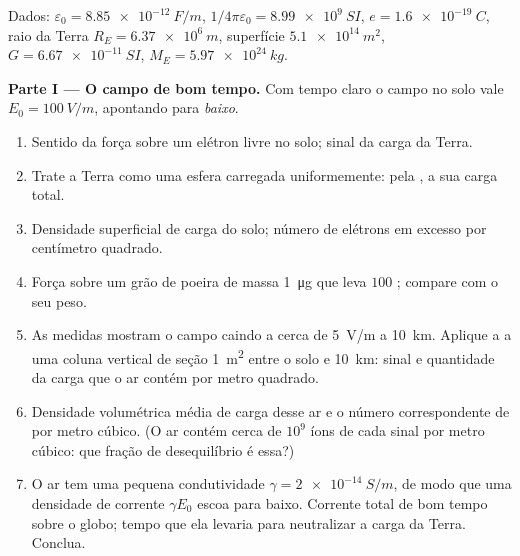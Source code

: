 \begin{problem}
\label{pb:b1:electrostatics-gauss:1}
Dados: $\varepsilon_0 = \qty{8.85e-12}{F/m}$, $1/4\pi\varepsilon_0 = \qty{8.99e9}{SI}$,
$e = \qty{1.6e-19}{C}$, raio da Terra $R_E = \qty{6.37e6}{m}$, superfície
$\qty{5.1e14}{m^2}$, $G = \qty{6.67e-11}{SI}$, $M_E = \qty{5.97e24}{kg}$.

\medskip
\noindent\textbf{Parte I --- O campo de bom tempo.}
Com tempo claro o campo no solo vale $E_0 = \qty{100}{V/m}$, apontando
para \emph{baixo}.
\begin{enumerate}
  \item Sentido da força sobre um elétron livre no solo; sinal
        da carga da Terra.
  \item Trate a Terra como uma esfera carregada uniformemente: pela ,
        a sua carga total.
  \item Densidade superficial de carga do solo; número de elétrons em excesso
        por centímetro quadrado.
  \item Força sobre um grão de poeira de massa \qty{1}{\micro g} que leva $100$
        ; compare com o seu peso.
  \item As medidas mostram o campo caindo a cerca de \qty{5}{V/m} a
        \qty{10}{km}. Aplique a  a uma coluna vertical de
        seção \qty{1}{m^2} entre o solo e \qty{10}{km}: sinal
        e quantidade da carga que o ar contém por metro quadrado.
  \item Densidade volumétrica média de carga desse ar e o número
        correspondente de  por metro cúbico. (O ar contém
        cerca de $10^9$ íons de cada sinal por metro cúbico: que fração de
        desequilíbrio é essa?)
  \item O ar tem uma pequena condutividade $\gamma = \qty{2e-14}{S/m}$, de modo que uma
        densidade de corrente $\gamma E_0$ escoa para baixo. Corrente total de bom
        tempo sobre o globo; tempo que ela levaria para neutralizar a
        carga da Terra. Conclua.
\end{enumerate}


\end{problem}

